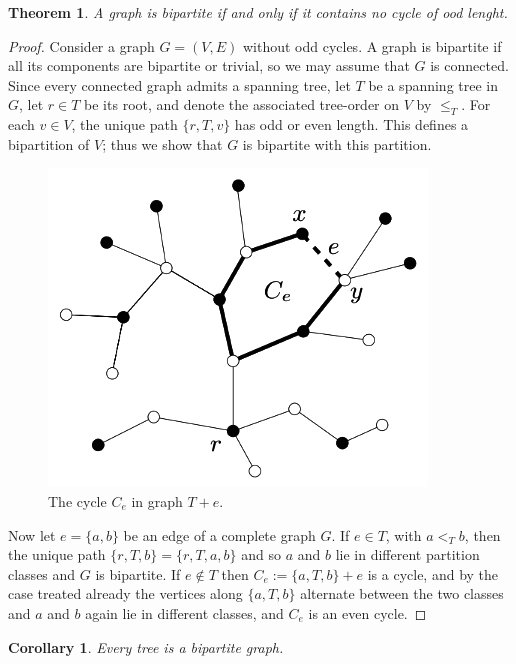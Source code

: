 \documentclass[10pt,a4paper]{book}
\numberwithin{equation}{chapter}
\numberwithin{figure}{chapter}
\numberwithin{table}{chapter}
\newtheorem{theorem}{Theorem}[section]
\newtheorem{corollary}{Corollary}
\begin{document}
\begin{theorem}
A graph is bipartite if and only if it contains no cycle of ood lenght.
\end{theorem}
\begin{proof}
Consider a graph $G=(V,E)$ without odd cycles. A graph is bipartite if all its components are bipartite or trivial, so we may assume that $G$ is connected. Since every connected graph admits a spanning tree, let $T$ be a spanning tree in $G$, let $r\in T$ be its root, and denote the associated tree-order on $V$ by $\leqslant_T$. For each $v\in V$, the unique path $\lbrace r,T,v\rbrace$ has odd or even length. This defines a bipartition of $V$; thus we show that $G$ is bipartite with this partition.
\begin{figure}[H]
    \begin{center}
        \includegraphics[scale=0.5]{Imagen5.png}
    \end{center}
    \caption{\footnotesize The cycle $C_e$ in graph $T+e$.}
    \label{fig5}
\end{figure}
Now let $e=\lbrace a,b \rbrace$ be an edge of a complete graph $G$. If $e\in T$, with $a<_{T}b$, then the unique path $\lbrace r,T,b \rbrace = \lbrace r,T,a,b\rbrace$ and so $a$ and $b$ lie in different partition classes and $G$ is bipartite. If $e\not\in T$ then $C_e:= \lbrace a,T,b\rbrace + e$ is a cycle, and by the case treated already the vertices along $\lbrace a,T,b\rbrace$ alternate between the two classes and $a$ and $b$ again lie in different classes, and $C_e$ is an even cycle.
\end{proof}

\begin{corollary}
Every tree is a bipartite graph.
\end{corollary}
\end{document}
